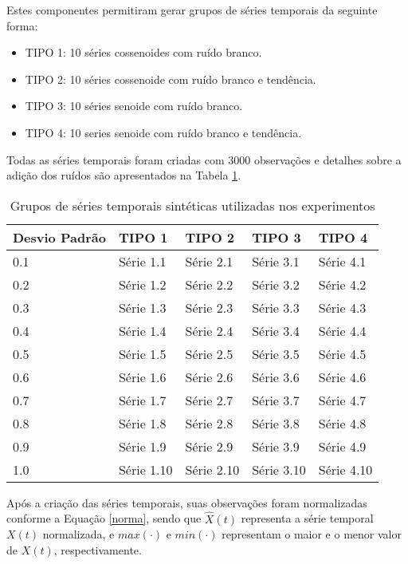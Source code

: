 Estes componentes permitiram gerar grupos de séries temporais da seguinte forma:

\begin{itemize}
\item TIPO 1: 10 séries cossenoides com ruído branco.
\item TIPO 2: 10 séries cossenoide com ruído branco e tendência.
\item TIPO 3: 10 séries senoide com ruído branco.
\item TIPO 4: 10 series senoide com ruído branco e tendência.
\end{itemize}

Todas as séries temporais foram criadas com $3000$ observações e detalhes sobre a adição dos ruídos são apresentados na Tabela \ref{series}.

\begin{table}[!ht]
\centering
\caption{Grupos de séries temporais sintéticas utilizadas nos experimentos}
\label{series}
\begin{tabular}{lllll}
\hline
Desvio Padrão & TIPO 1     & TIPO 2     & TIPO 3     & TIPO 4     \\
\hline
\hline
0.1           & Série 1.1  & Série 2.1  & Série 3.1  & Série 4.1  \\
0.2           & Série 1.2  & Série 2.2  & Série 3.2  & Série 4.2  \\
0.3           & Série 1.3  & Série 2.3  & Série 3.3  & Série 4.3  \\
0.4           & Série 1.4  & Série 2.4  & Série 3.4  & Série 4.4  \\
0.5           & Série 1.5  & Série 2.5  & Série 3.5  & Série 4.5  \\
0.6           & Série 1.6  & Série 2.6  & Série 3.6  & Série 4.6  \\
0.7           & Série 1.7  & Série 2.7  & Série 3.7  & Série 4.7  \\
0.8           & Série 1.8  & Série 2.8  & Série 3.8  & Série 4.8  \\
0.9           & Série 1.9  & Série 2.9  & Série 3.9  & Série 4.9  \\
1.0           & Série 1.10 & Série 2.10 & Série 3.10 & Série 4.10 \\
\hline
\end{tabular}
\end{table}

Após a criação das séries temporais, suas observações foram normalizadas conforme a Equação \ref{norma}, sendo que $\hat{X}(t)$ representa a série temporal $X(t)$ normalizada, e $max(\cdot)$ e $min(\cdot)$ representam o maior e o menor valor de $X(t)$, respectivamente.



